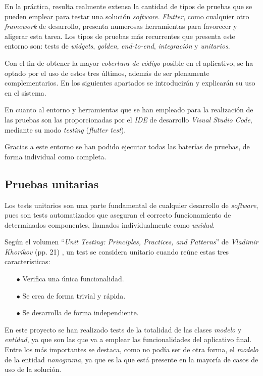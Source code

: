 En la práctica, resulta realmente extensa la cantidad de tipos de pruebas que se pueden emplear para testar una
 solución \textit{software}. \textit{Flutter}, como cualquier otro \textit{framework} de desarrollo, presenta
 numerosas herramientas para favorecer y aligerar esta tarea. Los tipos de pruebas más recurrentes que presenta este entorno
 son: tests de \textit{widgets}, \textit{golden}, \textit{end-to-end}, 
 \textit{integración} y \textit{unitarios}.
 
 Con el fin de obtener la mayor \textit{cobertura de código} posible en el aplicativo, se ha optado por el uso de estos
 tres últimos, además de ser plenamente complementarios. En los siguientes apartados se introducirán y explicarán su uso en el sistema.

 En cuanto al entorno y herramientas que se han empleado para la realización de las pruebas
 son las proporcionadas por el \textit{IDE} de desarrollo \textit{Visual Studio Code}, mediante su modo
 \textit{testing} (\textit{flutter test}).

 Gracias a este entorno se han podido ejecutar todas las baterías de pruebas,
 de forma individual como completa. 

 \subsection{Pruebas unitarias}
 Los tests unitarios son una parte fundamental de cualquier desarrollo
 de \textit{software}, pues son tests automatizados que aseguran el correcto
 funcionamiento de determinados componentes, llamados individualmente como \textit{unidad}.

 Según el volumen ``\textit{Unit Testing: Principles, Practices, and Patterns}'' de \textit{Vladimir Khorikov} (pp. 21) \cite{khorikov2020unit}, un test se considera unitario cuando reúne estas tres características:
 \begin{itemize}
     \item[$\bullet$] Verifica una única funcionalidad.
     \item[$\bullet$] Se crea de forma trivial y rápida.
     \item[$\bullet$] Se desarrolla de forma independiente.
 \end{itemize}

 En este proyecto se han realizado tests de la totalidad de las clases \textit{modelo} y \textit{entidad}, ya que
 son las que va a emplear las funcionalidades del aplicativo final. Entre los más importantes se destaca, como
 no podía ser de otra forma, el \textit{modelo} de la entidad
 \textit{nonograma}, ya que es la que está presente en la mayoría de casos de uso de la solución.

